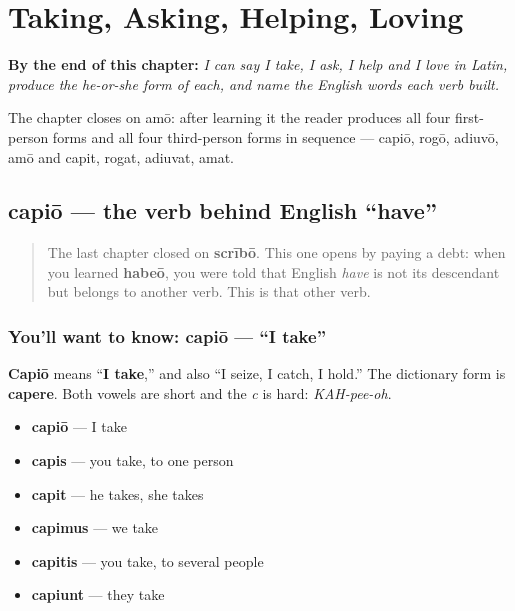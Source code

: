 
\chapter{Taking, Asking, Helping, Loving}
\label{ch:la-doing-verbs}

\begin{chapteropening}
\textbf{By the end of this chapter:} \emph{I can say I take, I ask, I help and I love in Latin, produce the he-or-she form of each, and name the English words each verb built.}

The chapter closes on amō: after learning it the reader produces all four first-person forms and all four third-person forms in sequence — capiō, rogō, adiuvō, amō and capit, rogat, adiuvat, amat.
\end{chapteropening}

\section[capiō, capere]{capiō — the verb behind English \textquotedblleft{}have\textquotedblright{}}

\label{lesson:LA-C39-capio}



\begin{quote}
The last chapter closed on \textbf{scrībō}. This one opens by paying a debt: when you learned \textbf{habeō}, you were told that English \emph{have} is not its descendant but belongs to another verb. This is that other verb.
\end{quote}

\subsection*{You'll want to know: capiō — \textquotedblleft{}I take\textquotedblright{}}
\textbf{Capiō} means \textquotedblleft{}\textbf{I take},\textquotedblright{} and also \textquotedblleft{}I seize, I catch, I hold.\textquotedblright{} The dictionary form is \textbf{capere}. Both vowels are short and the \emph{c} is hard: \emph{KAH-pee-oh}.

\begin{itemize}
\raggedright
  \item \textbf{capiō} — I take
  \item \textbf{capis} — you take, to one person
  \item \textbf{capit} — he takes, she takes
  \item \textbf{capimus} — we take
  \item \textbf{capitis} — you take, to several people
  \item \textbf{capiunt} — they take
\end{itemize}

